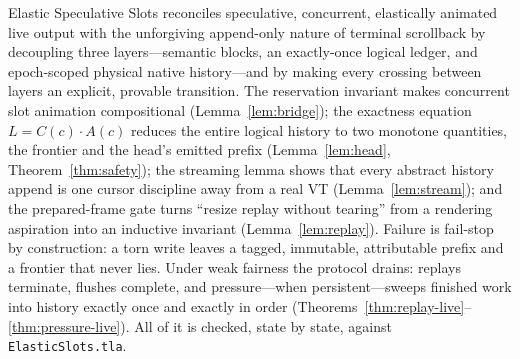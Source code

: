 \documentclass[11pt]{article}
\newcommand{\cat}{\mathbin{\cdot}}             %
\newcommand{\Ledger}{L}
\theoremstyle{definition}
\theoremstyle{remark}
\begin{document}
Elastic Speculative Slots reconciles speculative, concurrent, elastically
animated live output with the unforgiving append-only nature of terminal
scrollback by decoupling three layers---semantic blocks, an exactly-once
logical ledger, and epoch-scoped physical native history---and by making
every crossing between layers an explicit, provable transition. The
reservation invariant makes concurrent slot animation compositional
(Lemma~\ref{lem:bridge}); the exactness equation $\Ledger=C(c)\cat A(c)$
reduces the entire logical history to two monotone quantities, the frontier
and the head's emitted prefix (Lemma~\ref{lem:head},
Theorem~\ref{thm:safety}); the streaming lemma shows that every abstract
history append is one cursor discipline away from a real VT
(Lemma~\ref{lem:stream}); and the prepared-frame gate turns ``resize replay
without tearing'' from a rendering aspiration into an inductive invariant
(Lemma~\ref{lem:replay}). Failure is fail-stop by construction: a torn write
leaves a tagged, immutable, attributable prefix and a frontier that never
lies. Under weak fairness the protocol drains: replays terminate, flushes
complete, and pressure---when persistent---sweeps finished work into
history exactly once and exactly in order
(Theorems~\ref{thm:replay-live}--\ref{thm:pressure-live}). All of it is
checked, state by state, against \texttt{ElasticSlots.tla}.
\end{document}
